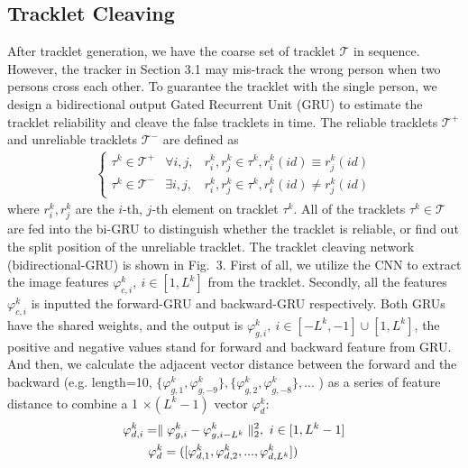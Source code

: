 \documentclass[5pt]{article}
\begin{document}
\subsection{Tracklet Cleaving}
\vspace{-0.1cm}
After tracklet generation, we have the coarse set of tracklet  $\mathcal{T}$ in sequence. However, the tracker in Section 3.1 may mis-track the wrong person when two persons cross each other. To guarantee the tracklet with the single person, we design a bidirectional output Gated Recurrent Unit (GRU) to estimate the tracklet reliability and cleave the false tracklets in time. The reliable tracklets $\mathcal{T}^+$ and unreliable tracklets $\mathcal{T}^-$ are defined as
\begin{eqnarray}
\left\{\begin{matrix}
\tau^k\in \mathcal{T}^+ &\forall i,j, &r_i^k,r_j^k\in \tau^k , r_i^k (id)\equiv r_j^k (id)\\
\tau^k\in \mathcal{T}^- &\exists i,j, & r_i^k,r_j^k \in \tau^k , r_i^k (id)\neq r_j^k (id)
\end{matrix}\right.
\end{eqnarray}
where $ r_i^k,r_j^k$ are the $i$-th, $j$-th element on tracklet $ \tau^k$. All of the tracklets $\tau^k \in \mathcal{T}$ are fed into the bi-GRU to distinguish whether the tracklet is reliable, or find out the split position of the unreliable tracklet. The tracklet cleaving network (bidirectional-GRU) is shown in Fig.\ 3. First of all, we utilize the CNN to extract the image features $\varphi_{c,i}^k,\ i\in[1,L^k]$ from the tracklet. Secondly, all the features  $\varphi_{c,i}^k$ is inputted the forward-GRU and backward-GRU respectively. Both GRUs have the shared weights, and the output is $\varphi_{g,i}^k,\ i\in[-L^k,-1]\cup[1,L^k]$, the positive and negative values stand for forward and backward feature from GRU. And then, we calculate the adjacent vector distance between the forward and the backward (e.g. length=10, $\{\varphi_{g,1}^k,\varphi_{g,-9}^k\},\{\varphi_{g,2}^k,\varphi_{g,-8}^k\}, ...$ ) as a series of feature distance to combine a 1 $\times (L^k-1)$ vector $\varphi_d^k$:
\begin{eqnarray}
\begin{split}
&\varphi_{d,i}^k=\parallel\varphi_{g,i}^k-\varphi_{g,i-L^k}^k\parallel_2^2,\ i\in[1,L^k-1]\\
&\quad\quad \varphi_d^k=([\varphi_{d,1}^k,\varphi_{d,2}^k,...,\varphi_{d,L^k}^k])\\
\end{split}
\vspace{-0.2cm}
\end{eqnarray}
\end{document}
